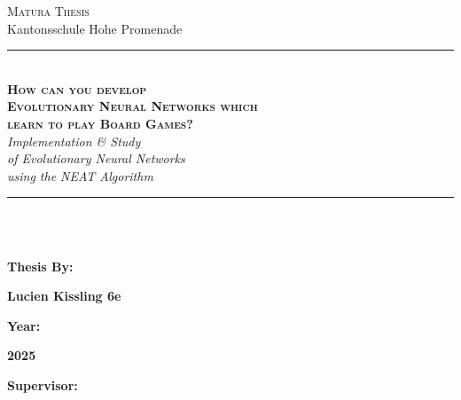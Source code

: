\documentclass[11pt, a4paper]{report}
\begin{document}
    \begin{titelpage}
        \BgThispage
            \color{white} {
                \begin{center}
                    \Large \textsc{Matura Thesis}\\Kantonsschule Hohe Promenade\\
                    \rule[0.1cm]{15.8cm}{0.1mm}\\
                    \vspace{3cm}
                    \Huge \textbf{ \textsc{How can you develop \\Evolutionary Neural Networks which \\learn to play Board Games?}}\\
                    \vspace{0.8cm}
                    \Large \textit {Implementation \& Study \\of Evolutionary Neural Networks \\using the NEAT Algorithm}\\
                \end{center}
                \vspace{3cm}
                \rule[0.1cm]{15.8cm}{0.1mm}\\
                \vspace{7cm}\\
                \begin{minipage}[t]{0.47\textwidth}
                \large\textbf {Thesis By:}\\
                \end{minipage}
                \hfill
                \begin{minipage}[t]{0.47\textwidth}\raggedleft
                \large\textbf {Lucien Kissling 6e}\\
                \end{minipage}
                \begin{minipage}[t]{0.47\textwidth}
                \large \textbf {Year:}\\
                \end{minipage}
                \hfill
                \begin{minipage}[t]{0.47\textwidth}\raggedleft
                \large \textbf {2025}\\
                \end{minipage}
                \begin{minipage}[t]{0.47\textwidth}
                \large \textbf {Supervisor:}\\

\end{minipage}}
\end{titelpage}
\end{document}
